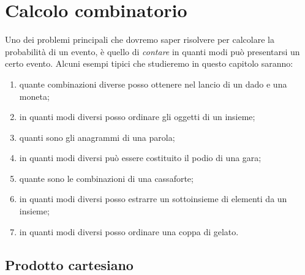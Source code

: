 


\chapter{Calcolo combinatorio}

Uno dei problemi principali che dovremo saper risolvere per calcolare la 
probabilità di un evento, è quello di \emph{contare} in quanti modi può 
presentarsi un certo evento. 
Alcuni esempi tipici che studieremo in questo capitolo saranno:
\begin{enumerate}[nosep]
\item quante combinazioni diverse posso ottenere nel lancio di un dado e una 
moneta;
\item in quanti modi diversi posso ordinare gli oggetti di un insieme;
\item quanti sono gli anagrammi di una parola;
\item in quanti modi diversi può essere costituito il podio di una gara;
\item quante sono le combinazioni di una cassaforte;
\item in quanti modi diversi posso estrarre un sottoinsieme di elementi da un 
insieme;
\item in quanti modi diversi posso ordinare una coppa di gelato.
\end{enumerate}


\section{Prodotto cartesiano}
\label{sec:calc_combinatorio_prodotto}

